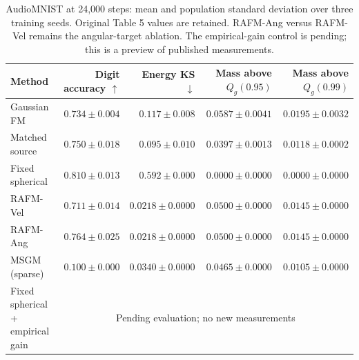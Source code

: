 \begin{table}[t]\centering\small
\begin{tabular}{lrrrr}
\toprule
Method & Digit accuracy $\uparrow$ & Energy KS $\downarrow$ & Mass above $Q_g(0.95)$ & Mass above $Q_g(0.99)$ \\
\midrule
Gaussian FM & $0.734 \pm 0.004$ & $0.117 \pm 0.008$ & $0.0587 \pm 0.0041$ & $0.0195 \pm 0.0032$ \\
Matched source & $0.750 \pm 0.018$ & $0.095 \pm 0.010$ & $0.0397 \pm 0.0013$ & $0.0118 \pm 0.0002$ \\
Fixed spherical & $0.810 \pm 0.013$ & $0.592 \pm 0.000$ & $0.0000 \pm 0.0000$ & $0.0000 \pm 0.0000$ \\
RAFM-Vel & $0.711 \pm 0.014$ & $0.0218 \pm 0.0000$ & $0.0500 \pm 0.0000$ & $0.0145 \pm 0.0000$ \\
RAFM-Ang & $0.764 \pm 0.025$ & $0.0218 \pm 0.0000$ & $0.0500 \pm 0.0000$ & $0.0145 \pm 0.0000$ \\
MSGM (sparse) & $0.100 \pm 0.000$ & $0.0340 \pm 0.0000$ & $0.0465 \pm 0.0000$ & $0.0105 \pm 0.0000$ \\
\midrule
Fixed spherical + empirical gain & \multicolumn{4}{c}{Pending evaluation; no new measurements} \\
\bottomrule
\end{tabular}
\caption{AudioMNIST at 24,000 steps: mean and population standard deviation over three training seeds. Original Table 5 values are retained. RAFM-Ang versus RAFM-Vel remains the angular-target ablation. The empirical-gain control is pending; this is a preview of published measurements.}
\label{tab:audio-with-empirical-gain}
\end{table}

